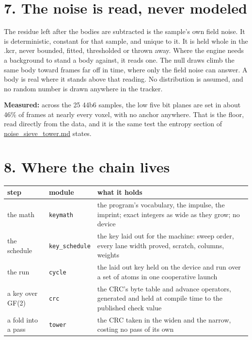 \section{\texorpdfstring{7. The noise is read, never modeled}{7. The noise is read, never modeled}}

The residue left after the bodies are subtracted is the sample's own field noise. It is deterministic, constant for that sample, and unique to it. It is held whole in the .kcr, never bounded, fitted, thresholded or thrown away. Where the engine needs a background to stand a body against, it reads one. The null draws climb the same body toward frames far off in time, where only the field noise can answer. A body is real where it stands above that reading. No distribution is assumed, and no random number is drawn anywhere in the tracker.

\textbf{Measured:} across the 25 44b6 samples, the low five bit planes are set in about 46\% of frames at nearly every voxel, with no anchor anywhere. That is the floor, read directly from the data, and it is the same test the entropy section of \hyperref[chap:noise-sieve-tower]{noise\_\allowbreak{}sieve\_\allowbreak{}tower.md} states.

\section{\texorpdfstring{8. Where the chain lives}{8. Where the chain lives}}

{\small
\setlength{\tabcolsep}{6pt}
\begin{longtable}{>{\RaggedRight\arraybackslash}p{}>{\RaggedRight\arraybackslash}p{}>{\RaggedRight\arraybackslash}p{}}
\toprule
step & module & what it holds \\
\midrule
\endhead
the math & \texttt{keymath} & the program's vocabulary, the impulse, the imprint; exact integers as wide as they grow; no device \\
the schedule & \texttt{key\_\allowbreak{}schedule} & the key laid out for the machine: sweep order, every lane width proved, scratch, columns, weights \\
the run & \texttt{cycle} & the laid out key held on the device and run over a set of atoms in one cooperative launch \\
a key over GF(2) & \texttt{crc} & the CRC's byte table and advance operators, generated and held at compile time to the published check value \\
a fold into a pass & \texttt{tower} & the CRC taken in the widen and the narrow, costing no pass of its own \\
\bottomrule
\end{longtable}
}
